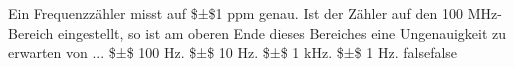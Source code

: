     {Ein Frequenzzähler misst auf \$±\$1 ppm genau. Ist der Zähler auf den 100 MHz-Bereich eingestellt, so ist am oberen Ende dieses Bereiches eine Ungenauigkeit zu erwarten von ...}
    {\$±\$ 100 Hz.}
    {\$±\$ 10 Hz.}
    {\$±\$ 1 kHz.}
    {\$±\$ 1 Hz.}
    {false}{false}